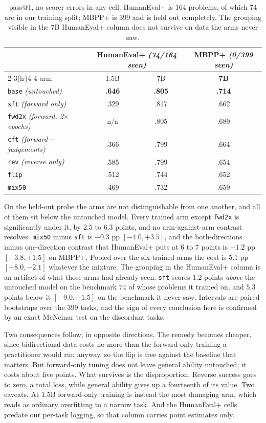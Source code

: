 \documentclass{article}
\newcommand{\arm}[1]{\texttt{#1}}
\begin{document}
\begin{table}[t]
\centering\small
\caption{pass@1, no scorer errors in any cell. HumanEval+ is 164 problems, of which 74 are in
our training split; MBPP+ is 399 and is held out completely. The grouping visible in the 7B
HumanEval+ column does not survive on data the arms never saw.}
\label{tab:humaneval}
\begin{tabular}{lccc}
\toprule
& \multicolumn{2}{c}{HumanEval+ \emph{(74/164 seen)}} & MBPP+ \emph{(0/399 seen)} \\
\cmidrule(lr){2-3}\cmidrule(lr){4-4}
arm & 1.5B & 7B & \textbf{7B} \\
\midrule
\arm{base} \emph{(untouched)} & \textbf{.646} & \textbf{.805} & \textbf{.714} \\
\midrule
\arm{sft} \emph{(forward only)} & .329 & .817 & .662 \\
\arm{fwd2x} \emph{(forward, 2$\times$ epochs)} & n/a & .805 & .689 \\
\arm{cft} \emph{(forward $+$ judgements)} & .366 & .799 & .664 \\
\arm{rev} \emph{(reverse only)} & .585 & .799 & .654 \\
\arm{flip} & .512 & .744 & .652 \\
\arm{mix50} & .469 & .732 & .659 \\
\bottomrule
\end{tabular}
\end{table}

On the held-out probe the arms are not distinguishable from one another, and all of them sit
below the untouched model. Every trained arm except \arm{fwd2x} is significantly under it, by
$2.5$ to $6.3$ points, and no arm-against-arm contrast resolves. \arm{mix50} minus \arm{sft} is
$-0.3$ pp $[-4.0,+3.5]$, and the both-directions minus one-direction contrast that HumanEval+
puts at 6 to 7 points is $-1.2$ pp $[-3.8,+1.5]$ on MBPP+. Pooled over the six trained arms the
cost is $5.1$ pp $[-8.0,-2.1]$ whatever the mixture. The grouping in the HumanEval+ column is an
artifact of what those arms had already seen. \arm{sft} scores $1.2$ points \emph{above} the
untouched model on the benchmark 74 of whose problems it trained on, and $5.3$ points below it
$[-9.0,-1.5]$ on the benchmark it never saw. Intervals are paired bootstraps over the 399 tasks,
and the sign of every conclusion here is confirmed by an exact McNemar test on the discordant
tasks.

Two consequences follow, in opposite directions. The remedy becomes cheaper, since bidirectional data
costs no more than the forward-only training a practitioner would run anyway, so the flip is free
against the baseline that matters. But forward-only tuning does not leave general ability
untouched; it costs about five points. What survives is the disproportion. Reverse success goes
to zero, a total loss, while general ability gives up a fourteenth of its value. Two caveats. At
1.5B forward-only training is instead the most damaging arm, which reads as ordinary overfitting
to a narrow task. And the HumanEval+ cells predate our per-task logging, so that column carries
point estimates only.
\end{document}
